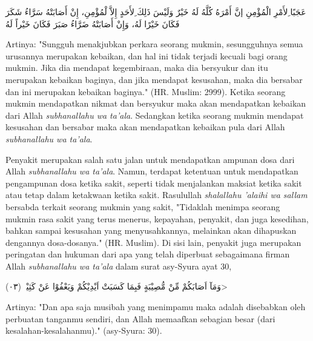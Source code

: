     \begin{flushright}
        \begin{RLtext}
            عَجَبًا ِلأَمْرِ الْمُؤْمِنِ إنَّ أَمْرَهُ كُلَّهُ لَهُ خَيْرٌ وَلَيْسَ ذَلِكَ ِلأَحَدٍ إِلاَّ لْمُؤْمِنِ، إِنْ أَصَابَتْهُ سَرَّاءُ شَكَرَ فَكَانَ خَيْرًا لَهُ، وَإِنْ أَصَابَتْهُ ضَرَّاءُ صَبَرَ فَكَانَ خَيْراً لَهُ
        \end{RLtext}
    \end{flushright}

    Artinya: "Sungguh menakjubkan perkara seorang mukmin, sesungguhnya semua urusannya merupakan kebaikan, dan hal ini tidak terjadi kecuali bagi orang mukmin. Jika dia mendapat kegembiraan, maka dia bersyukur dan itu merupakan kebaikan baginya, dan jika mendapat kesusahan, maka dia bersabar dan ini merupakan kebaikan baginya." (HR. Muslim: 2999). Ketika seorang mukmin mendapatkan nikmat dan bersyukur maka akan mendapatkan kebaikan dari Allah \textit{subhanallahu wa ta'ala}. Sedangkan ketika seorang mukmin mendapat kesusahan dan bersabar maka akan mendapatkan kebaikan pula dari Allah \textit{subhanallahu wa ta'ala}.

    Penyakit merupakan salah satu jalan untuk mendapatkan ampunan dosa dari Allah \textit{subhanallahu wa ta'ala}. Namun, terdapat ketentuan untuk mendapatkan pengampunan dosa ketika sakit, seperti tidak menjalankan maksiat ketika sakit atau tetap dalam ketakwaan ketika sakit. Rasulullah \textit{shalallahu 'alaihi wa sallam} bersabda terkait seorang mukmin yang sakit, "Tidaklah menimpa seorang mukmin rasa sakit yang terus menerus, kepayahan, penyakit, dan juga kesedihan, bahkan sampai kesusahan yang menyusahkannya, melainkan akan dihapuskan dengannya dosa-dosanya." (HR. Muslim). Di sisi lain, penyakit juga merupakan peringatan dan hukuman dari apa yang telah diperbuat sebagaimana firman Allah \textit{subhanallahu wa ta'ala} dalam surat asy-Syura ayat 30,

    \begin{flushright}
        \<وَمَآ اَصَابَكُمْ مِّنْ مُّصِيْبَةٍ فَبِمَا كَسَبَتْ اَيْدِيْكُمْ وَيَعْفُوْا عَنْ كَثِيْرٍۗ (٠٣)>
    \end{flushright}

    Artinya: "Dan apa saja musibah yang menimpamu maka adalah disebabkan oleh perbuatan tanganmu sendiri, dan Allah memaafkan sebagian besar (dari kesalahan-kesalahanmu)." (asy-Syura: 30).

